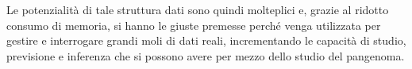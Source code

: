 \documentclass[a4paper,11pt, oneside,italian]{article}
\begin{document}
Le potenzialità di tale struttura dati sono quindi molteplici e, grazie al
ridotto consumo di memoria, si hanno le giuste premesse perché venga utilizzata
per gestire e interrogare grandi moli di dati reali, incrementando le capacità
di studio, previsione e inferenza che si possono avere per mezzo dello studio
del pangenoma.
\end{document}

